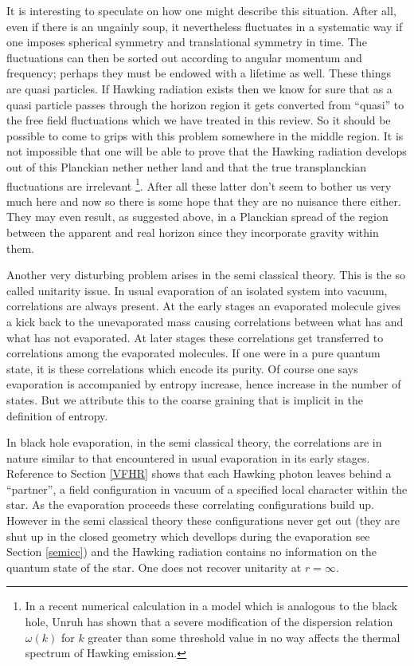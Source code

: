 \documentclass[12pt,oneside]{report}
\begin{document}
It is interesting to speculate on how one might describe this situation. After
all, even if there is an ungainly soup, it nevertheless fluctuates in a
systematic way if one imposes spherical symmetry and translational symmetry in
time. The fluctuations can then be sorted out according to angular momentum and
frequency; perhaps they must be endowed with a lifetime as well. These things
are quasi particles. If Hawking radiation exists then we know for sure that as a
quasi particle passes through the horizon region it gets converted from
``quasi'' to the free field fluctuations which we have treated in this review.
So it should be possible to come to grips with this problem somewhere in the
middle region. It is not impossible that one will be able to prove that the
Hawking radiation develops out of this Planckian nether nether land and that
the true transplanckian fluctuations are irrelevant
\footnote{In a recent numerical calculation in a model which is analogous to the black hole, Unruh \cite{Unru3} has shown that a severe modification of the dispersion relation $\omega(k)$ for $k$ greater than some threshold value in no way affects the thermal spectrum of Hawking emission.}. After all these latter
don't seem to bother us very much here and now so there is some hope that they
are no nuisance there either. They may even result, as suggested above, in a
Planckian spread of the region between the apparent and real horizon since they
incorporate gravity within them.

Another very disturbing problem 
arises in the semi classical
theory. This is the so called unitarity issue\cite{Hawk3}.
In usual evaporation of an isolated system into vacuum,
correlations
are always present. At the early stages an evaporated molecule
gives a kick back to the unevaporated mass causing
correlations between what has and what has not
evaporated. At later stages these correlations get
transferred to correlations among the evaporated
molecules\cite{page93}.
If one were in a pure quantum state, it is
these correlations which encode its purity. Of course
one says evaporation is accompanied by entropy
increase, hence increase in the number of states. But we
attribute this to the coarse graining that is  implicit
in the definition of entropy.

In black hole evaporation, in the semi classical theory,
the correlations 
are in nature
similar to that encountered in usual evaporation in its early stages.
Reference to Section \ref{VFHR}
shows that each Hawking photon leaves behind a
``partner'', a field configuration in vacuum of a
specified local character within the star. As the
evaporation proceeds these correlating configurations
build up.  However in the semi classical theory these
configurations never get out (they are shut up in the closed
 geometry which devellops during the evaporation see Section \ref{semicc})
 and the Hawking
radiation contains no information on the quantum state of
the star. One does not recover unitarity at $r=\infty$.
\end{document}
